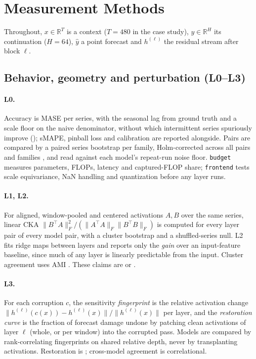 \section{Measurement Methods}
\label{sec:methods}

Throughout, $x\in\mathbb{R}^{T}$ is a context ($T=480$ in the case study), $y\in\mathbb{R}^{H}$ its
continuation ($H=64$), $\hat y$ a point forecast and $h^{(\ell)}$ the residual stream after block $\ell$.

\subsection{Behavior, geometry and perturbation (L0--L3)}
\label{sec:l0}
\label{sec:l1l2}
\label{sec:l3}

\paragraph{L0.} Accuracy is MASE \citep{hyndman2006mase} per series, with the seasonal lag from ground truth
and a scale floor on the naive denominator, without which intermittent series spuriously improve
(); sMAPE, pinball loss \citep{gneiting2007scoring} and calibration are reported alongside. Pairs
are compared by a paired series bootstrap per family, Holm-corrected across all pairs and families
\citep{holm1979}, and read against each model's repeat-run noise floor. \texttt{budget} measures parameters,
FLOPs, latency and captured-FLOP share; \texttt{frontend} tests scale equivariance, NaN handling and
quantization before any layer runs.

\paragraph{L1, L2.} For aligned, window-pooled and centered activations $A,B$ over the same series, linear
CKA \citep{kornblith2019cka} $\|B^{\top}A\|_F^2/(\|A^{\top}A\|_F\|B^{\top}B\|_F)$ is computed for every layer
pair of every model pair, with a cluster bootstrap and a shuffled-series null. L2 fits ridge maps between
layers and reports only the \emph{gain} over an input-feature baseline, since much of any layer is linearly
predictable from the input. Cluster agreement uses AMI \citep{vinh2010ami}. These claims are
 or .

\paragraph{L3.} For each corruption $c$, the sensitivity \emph{fingerprint} is the relative activation change
$\|h^{(\ell)}(c(x))-h^{(\ell)}(x)\|/\|h^{(\ell)}(x)\|$ per layer, and the \emph{restoration curve} is the
fraction of forecast damage undone by patching clean activations of layer $\ell$ (whole, or per window) into
the corrupted pass. Models are compared by rank-correlating fingerprints on shared relative depth, never by
transplanting activations. Restoration is ; cross-model agreement is correlational.

